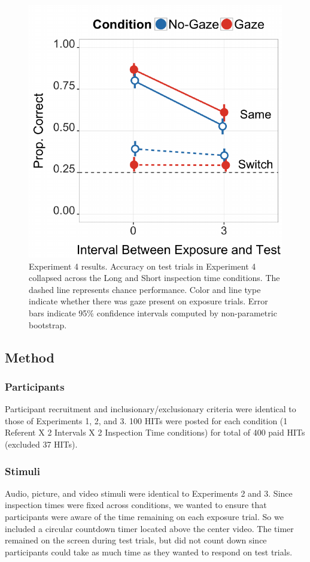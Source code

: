 \documentclass[authoryear, review]{elsarticle}
\newenvironment{CodeChunk}{}{}
\begin{document}
\begin{CodeChunk}
\begin{figure}[tb]

{\centering \includegraphics[width=0.5\linewidth]{figs/expt4-plot-1} 

}

\caption[Experiment 4 results]{Experiment 4 results. Accuracy on test trials in Experiment 4 collapsed across the Long and Short inspection time conditions. The dashed line represents chance performance. Color and line type indicate whether there was gaze present on exposure trials. Error bars indicate 95\% confidence intervals computed by non-parametric bootstrap. }\label{fig:expt4-plot}
\end{figure}
\end{CodeChunk}

\subsection{Method}\label{method-3}

\subsubsection{Participants}\label{participants-3}

Participant recruitment and inclusionary/exclusionary criteria were
identical to those of Experiments 1, 2, and 3. 100 HITs were posted for
each condition (1 Referent X 2 Intervals X 2 Inspection Time conditions)
for total of 400 paid HITs (excluded 37 HITs).

\subsubsection{Stimuli}\label{stimuli-2}

Audio, picture, and video stimuli were identical to Experiments 2 and 3.
Since inspection times were fixed across conditions, we wanted to ensure
that participants were aware of the time remaining on each exposure
trial. So we included a circular countdown timer located above the
center video. The timer remained on the screen during test trials, but
did not count down since participants could take as much time as they
wanted to respond on test trials.
\end{document}
